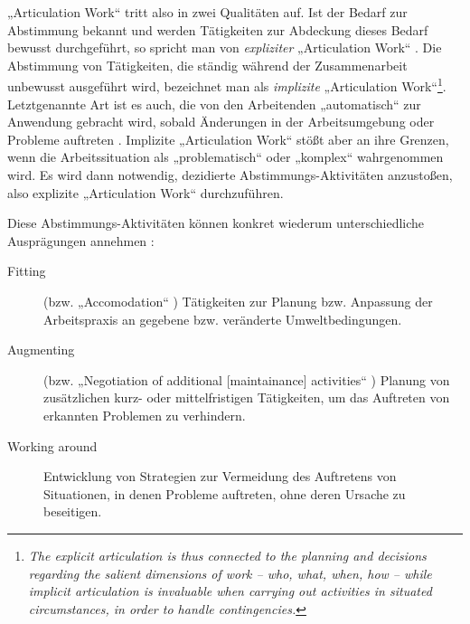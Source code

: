 „Articulation Work“ tritt also in zwei Qualitäten auf. Ist der Bedarf zur Abstimmung bekannt und werden Tätigkeiten zur Abdeckung dieses Bedarf bewusst durchgeführt, so spricht man von \emph{expliziter} „Articulation Work“ \citep{Strauss88} \citep{Fjuk97}. Die Abstimmung von Tätigkeiten, die ständig während der Zusammenarbeit unbewusst ausgeführt wird, bezeichnet man als \emph{implizite} „Articulation Work“\footnote{\emph{The explicit articulation is thus connected to the planning and decisions regarding the salient dimensions of work -- who, what, when, how -- while implicit articulation is invaluable when carrying out activities in situated circumstances, in order to handle contingencies.}\citep[][S.5]{Fjuk97}}. Letztgenannte Art ist es auch, die von den Arbeitenden „automatisch“ zur Anwendung gebracht wird, sobald Änderungen in der Arbeitsumgebung oder Probleme auftreten \citep{Strauss88}. Implizite „Articulation Work“ stößt aber an ihre Grenzen, wenn die Arbeitssituation als „problematisch“ \citep{Strauss88} oder „komplex“ \citep[][S. 23f]{Schmidt90} wahrgenommen wird. Es wird dann notwendig, dezidierte Abstimmungs-Aktivitäten anzustoßen, also explizite „Articulation Work“ durchzuführen.

Diese Abstimmungs-Aktivitäten können konkret wiederum unterschiedliche Ausprägungen annehmen \citep{Gasser86}:
\begin{description}
	\item[Fitting] (bzw. „Accomodation“ \citep{Bendifallah87}) Tätigkeiten zur Planung bzw. Anpassung der Arbeitspraxis an gegebene bzw. veränderte Umweltbedingungen.
	\item[Augmenting] (bzw. „Negotiation of additional [maintainance] activities“ \citep{Bendifallah87}) Planung von zusätzlichen kurz- oder mittelfristigen Tätigkeiten, um das Auftreten von erkannten Problemen zu verhindern. 
	\item[Working around] Entwicklung von Strategien zur Vermeidung des Auftretens von Situationen, in denen Probleme auftreten, ohne deren Ursache zu beseitigen.
\end{description}


